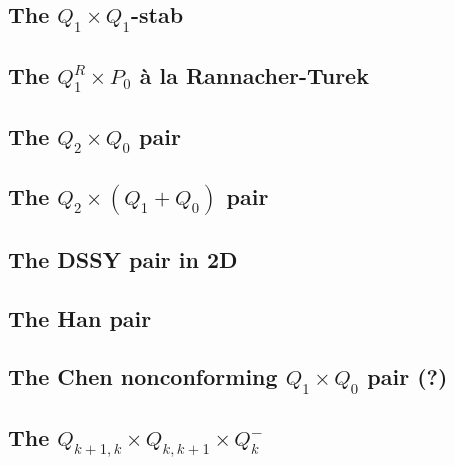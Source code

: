 \subsection{The $Q_1\times Q_1$-stab}


\subsection{The $Q_1^R\times P_0$ {\`a} la Rannacher-Turek \label{ss:RTq1p0}}


\subsection{The $Q_2\times Q_0$ pair} \label{ss:pairq2q0}


\subsection{The ${ Q}_2\times (Q_1+Q_0)$ pair} \label{ss:q2q1q0}


\subsection{The DSSY pair in 2D} \label{ss:pair_dssy2D}


\subsection{The Han pair} \label{ss:han}


\subsection{The Chen nonconforming ${ Q}_1\times Q_0$ pair (?)} \label{ss:chenq0}


\subsection{The $Q_{k+1,k}\times Q_{k,k+1} \times Q_{k}^-$ \label{ss:qqq_elt}}


